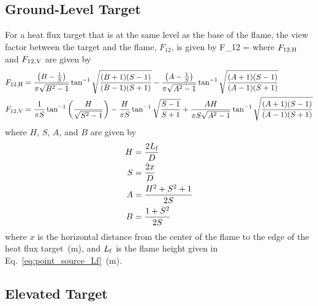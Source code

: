 \subsection*{Ground-Level Target}

\noindent For a heat flux target that is at the same level as the base of the flame, the view factor between the target and the flame, $F_{12}$, is given by
\be
F_{12} = 
\label{eq:solid_flame_F12_HV}
\ee
where $F_{\rm 12, H}$ and $F_{\rm 12, V}$ are given by
\begin{align}
F_{\rm 12, H} &= \frac{\left( B - \frac{1}{S} \right)}{\pi \sqrt{B^2 - 1}} \tan^{-1} \sqrt{ \frac{(B+1)(S-1)}{(B-1)(S+1)} } -
\frac{\left( A - \frac{1}{S} \right)}{\pi \sqrt{A^2 - 1}} \tan^{-1} \sqrt{ \frac{(A+1)(S-1)}{(A-1)(S+1)} } \\
F_{\rm 12, V} &= \frac{1}{\pi S} \tan^{-1} \left( \frac{H}{\sqrt{S^2-1}} \right) - \frac{H}{\pi S} \tan^{-1} \sqrt{\frac{S-1}{S+1}} +
\frac{A H}{\pi S \sqrt{A^2-1}} \tan^{-1} \sqrt{\frac{(A+1)(S-1)}{(A-1)(S+1)}}
\label{eq:solid_flame_F12_H_V}
\end{align}
where $H$, $S$, $A$, and $B$ are given by
\begin{align}
H &= \frac{2 L_{\rm f}}{D}        \\
S &= \frac{2 x}{D}              \\
A &= \frac{H^2 + S^2 + 1}{2 S}  \\
B &= \frac{1+S^2}{2 S}
\label{eq:solid_flame_H_S_A_B}
\end{align}
where $x$ is the horizontal distance from the center of the flame to the edge of the heat
flux target~(\si{m}), and $L_{\rm f}$ is the flame height given in Eq.~\ref{eq:point_source_Lf}~(\si{m}).


\clearpage


\subsection*{Elevated Target}


